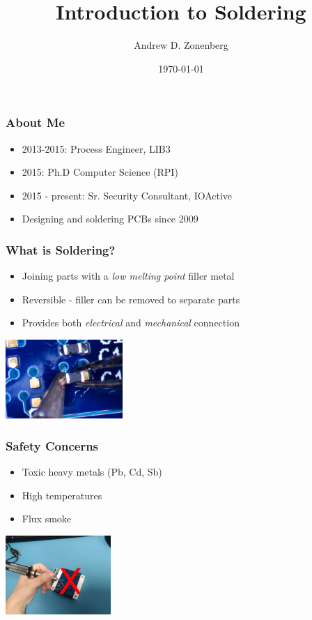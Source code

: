\documentclass{beamer}
\title{Introduction to Soldering}
\author{Andrew D. Zonenberg}
\date{\today}
\begin{document}
\frame{\titlepage}

\begin{frame}
\frametitle{About Me}

\begin{itemize}
\item 2013-2015: Process Engineer, LIB3
\item 2015: Ph.D Computer Science (RPI)
\item 2015 - present: Sr. Security Consultant, IOActive
\item Designing and soldering PCBs since 2009
\end{itemize}
\end{frame}

\begin{frame}
\frametitle{What is Soldering?}
\begin{itemize}
\item Joining parts with a \emph{low melting point} filler metal
\item Reversible - filler can be removed to separate parts
\item Provides both \emph{electrical} and \emph{mechanical} connection
\end{itemize}
\begin{center}
\includegraphics[height=3cm,keepaspectratio]{intro-shot.jpg}
\end{center}
\end{frame}

\begin{frame}
\frametitle{Safety Concerns}
\begin{itemize}
\item Toxic heavy metals (Pb, Cd, Sb)
\item High temperatures
\item Flux smoke
\end{itemize}
\begin{center}
\includegraphics[width=4cm,keepaspectratio]{safety.jpg}
\end{center}
\end{frame}
\end{document}
